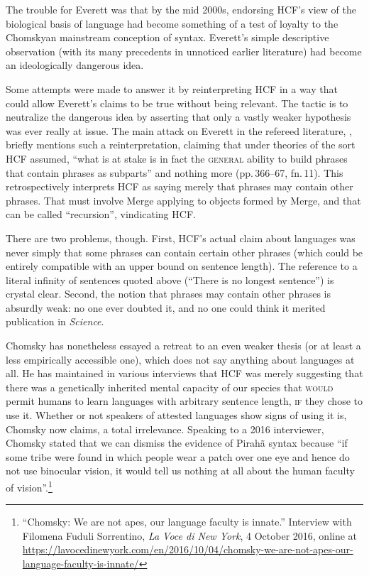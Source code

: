 \documentclass[output=paper,colorlinks,citecolor=brown
]{langscibook}
\begin{document}
The trouble for Everett was that by the mid 2000s, endorsing HCF's view
of the biological basis of language had become something of a test of
loyalty to the Chomskyan mainstream conception of syntax. Everett's
simple descriptive observation (with its many precedents in unnoticed
earlier literature) had become an ideologically dangerous idea.

Some attempts were made to answer it by reinterpreting HCF in a way
that could allow Everett's claims to be true without being relevant.
The tactic is to neutralize the dangerous idea by asserting that only
a vastly weaker hypothesis was ever really at issue. The main attack
on Everett in the refereed literature, \citet{NevPesRod09a}, briefly
mentions such a reinterpretation, claiming that under theories of the
sort HCF assumed, ``what is at stake is in fact the \textsc{general}
ability to build phrases that contain phrases as subparts'' and nothing
more (pp.\,366--67, fn.\,11). This retrospectively interprets HCF as
saying merely that phrases may contain other phrases. That must involve
Merge applying to objects formed by Merge, and that can be called
``recursion'', vindicating HCF.

There are two problems, though. First, HCF's actual claim about
languages was never simply that some phrases can contain certain other
phrases (which could be entirely compatible with an upper bound on
sentence length). The reference to a literal infinity of sentences
quoted above (``There is no longest sentence'') is crystal clear. Second,
the notion that phrases may contain other phrases is absurdly weak:
no one ever doubted it, and no one could think it merited publication
in \textit{Science}.

Chomsky has nonetheless essayed a retreat to an even weaker thesis
(or at least a less empirically accessible one), which does not say
anything about languages at all. He has maintained in various interviews
that HCF was merely suggesting that there was a genetically inherited
mental capacity of our species that \textsc{would} permit humans to
learn languages with arbitrary sentence length, \textsc{if} they chose
to use it. Whether or not speakers of attested languages show signs
of using it is, Chomsky now claims, a total irrelevance. Speaking to
a 2016 interviewer, Chomsky stated that we can dismiss the evidence of
Pirah{\~a} syntax because ``if some tribe were found in which people
wear a patch over one eye and hence do not use binocular vision, it
would tell us nothing at all about the human faculty of
vision''.\footnote{\label{sorrentino}%
   ``Chomsky: We are not apes, our language faculty is innate.''
   Interview with Filomena Fuduli Sorrentino, \textit{La Voce di New York},
   4 October 2016, online at
   \url{https://lavocedinewyork.com/en/2016/10/04/chomsky-we-are-not-apes-our-language-faculty-is-innate/}}
\end{document}
